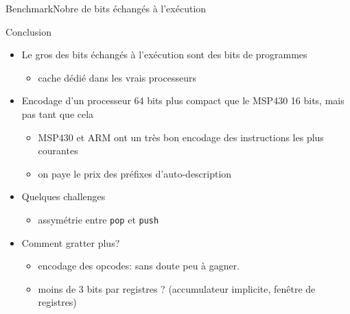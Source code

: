 \documentclass[slidetop,11pt,table]{beamer}
\begin{document}
\begin{frame}{Benchmark}{Nobre de bits échangés à l'exécution}
    \centering
\end{frame}

%   
%   

\begin{frame}{Conclusion}
  \begin{itemize}
  \item Le gros des bits échangés à l'exécution sont des bits de programmes
    \begin{itemize}
    \item cache dédié dans les vrais processeurs
    \end{itemize}
  \item Encodage d'un processeur 64 bits plus compact que le MSP430 16 bits, mais pas tant que cela
    \begin{itemize}
    \item MSP430 et ARM ont un très bon encodage des instructions les plus courantes
    \item on paye le prix des préfixes d'auto-description
    \end{itemize}
  \item Quelques challenges
    \begin{itemize}
    \item assymétrie entre \texttt{pop} et \texttt{push}
    \end{itemize}
  \item Comment gratter plus?
    \begin{itemize}
    \item encodage des opcodes: sans doute peu à gagner.
    \item moins de 3 bits par registres ? (accumulateur implicite, fenêtre de registres)
    \end{itemize}
  \end{itemize}

\end{frame}
\end{document}
